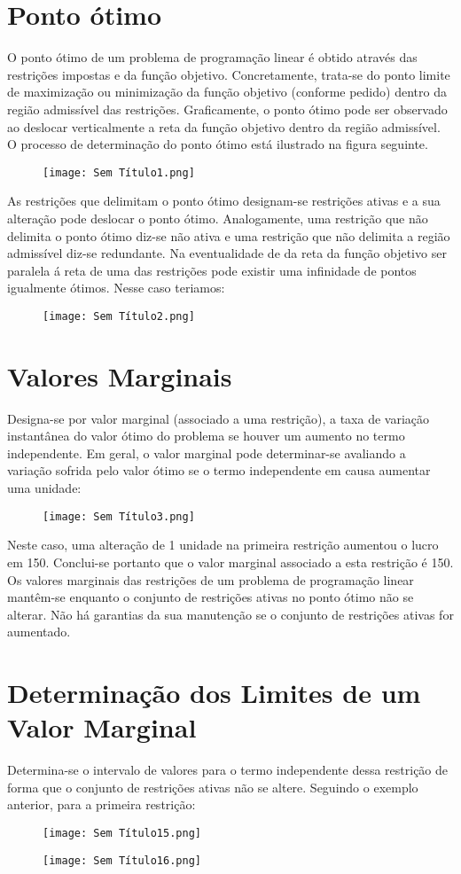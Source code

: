 \documentclass[10pt,a4paper]{report}
\begin{document}
\section{Ponto ótimo}
O ponto ótimo de um problema de programação linear é obtido através das restrições impostas e da função objetivo. Concretamente, trata-se do ponto limite de maximização ou minimização da função objetivo (conforme pedido) dentro da região admissível das restrições. Graficamente, o ponto ótimo pode ser observado ao deslocar verticalmente a reta da função objetivo dentro da região admissível. O processo de determinação do ponto ótimo está ilustrado na figura seguinte. 
\begin{figure}[H]
\centering
\texttt{[image: Sem Título1.png]}
\end{figure}
As restrições que delimitam o ponto ótimo designam-se restrições ativas e a sua alteração pode deslocar o ponto ótimo. Analogamente, uma restrição que não delimita o ponto ótimo diz-se não ativa e uma restrição que não delimita a região admissível diz-se redundante. Na eventualidade de da reta da função objetivo ser paralela á reta de uma das restrições pode existir uma infinidade de pontos igualmente ótimos. Nesse caso teriamos:
\begin{figure}[H]
\centering
\texttt{[image: Sem Título2.png]}
\end{figure}
\section{Valores Marginais}
Designa-se por valor marginal (associado a uma restrição), a taxa de variação instantânea do valor ótimo do problema se houver um aumento no termo independente. Em geral, o valor marginal pode determinar-se avaliando a variação sofrida pelo valor ótimo se o termo independente em causa aumentar uma unidade:
\begin{figure}[H]
\centering
\texttt{[image: Sem Título3.png]}
\end{figure}
Neste caso, uma alteração de 1 unidade na primeira restrição aumentou o lucro em 150. Conclui-se portanto que o valor marginal associado a esta restrição é 150. Os valores marginais das restrições de um problema de programação linear mantêm-se enquanto o conjunto de restrições ativas no ponto ótimo não se alterar. Não há garantias da sua manutenção se o conjunto de restrições ativas for aumentado.
\section{Determinação dos Limites de um Valor Marginal}
Determina-se o intervalo de valores para o termo independente dessa restrição de forma que o conjunto de restrições ativas não se altere. Seguindo o exemplo anterior, para a primeira restrição:
\begin{figure}[H]
\centering
\texttt{[image: Sem Título15.png]}
\end{figure}
\begin{figure}[H]
\centering
\texttt{[image: Sem Título16.png]}
\end{figure}
\end{document}
